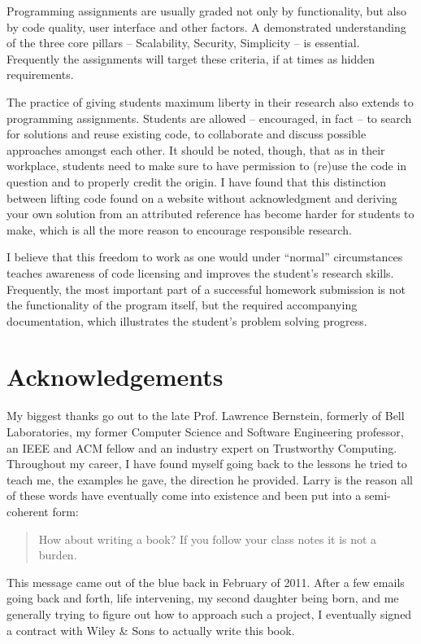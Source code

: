 Programming assignments are usually graded not only by
functionality, but also by code quality, user
interface and other factors.  A demonstrated
understanding of the three core pillars --
Scalability, Security, Simplicity -- is essential.
Frequently the assignments will target these criteria,
if at times as hidden requirements.

The practice of giving students maximum liberty in
their research also extends to programming
assignments.  Students are allowed -- encouraged, in
fact -- to search for solutions and reuse existing
code, to collaborate and discuss possible approaches
amongst each other.  It should be noted, though, that
as in their workplace, students need to make sure to
have permission to (re)use the code in question and to
properly credit the origin.  I have found that this
distinction between lifting code found on a website
without acknowledgment and deriving your own solution
from an attributed reference has become harder for
students to make, which is all the more reason to
encourage responsible research.

I believe that this freedom to work as one would under
``normal'' circumstances teaches awareness of code
licensing and improves the student's research skills.
Frequently, the most important part of a successful
homework submission is not the functionality of the
program itself, but the required accompanying
documentation, which illustrates the student's problem
solving progress.

\section*{Acknowledgements}

My biggest thanks go out to the late Prof. Lawrence
Bernstein, formerly
of Bell Laboratories, my former Computer Science and
Software Engineering professor, an IEEE and ACM fellow
and an industry expert on Trustworthy Computing.
Throughout my career, I have found myself going back
to the lessons he tried to teach me, the examples he
gave, the direction he provided.  Larry is the reason
all of these words have eventually come into existence
and been put into a semi-coherent form:

\begin{quote}
How about writing a book? If you follow your class
notes it is not a burden.
\end{quote}

This message came out of the blue back in February of
2011.  After a few emails going back and forth, life
intervening, my second daughter being born, and me
generally trying to figure out how to approach such a
project, I eventually signed a contract with Wiley \&
Sons to actually write this book.

